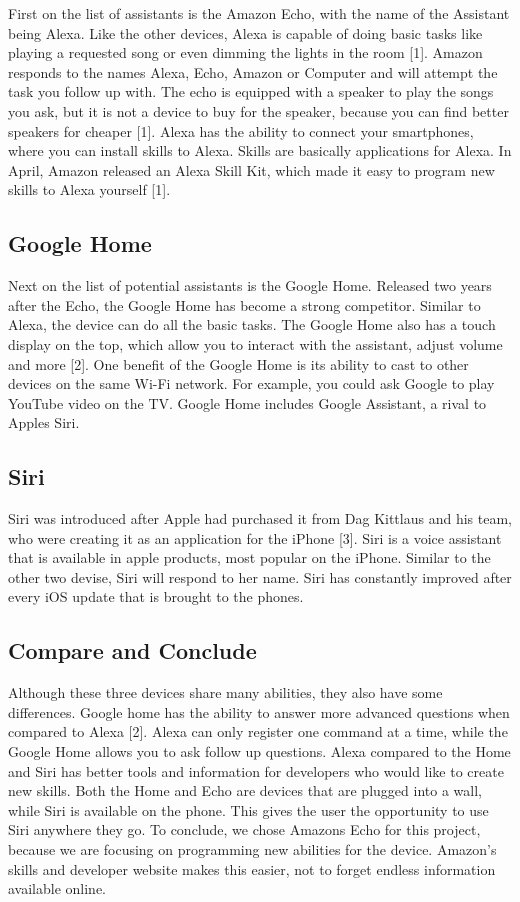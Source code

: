\documentclass[onecolumn, draftclsnofoot,10pt, compsoc]{IEEEtran}
\begin{document}
		First on the list of assistants is the Amazon Echo, with the name of the Assistant being Alexa. Like the other devices, Alexa is capable of doing basic tasks like playing a requested song or even dimming 
		the lights in the room [1]. Amazon responds to the names Alexa, Echo, Amazon or Computer and will attempt the task you follow up with. The echo is equipped with a speaker to play the songs you ask, but it is
		not a device to buy for the speaker, because you can find better speakers for cheaper [1]. Alexa has the ability to connect your smartphones, where you can install skills to Alexa. Skills are basically applications
		for Alexa. In April, Amazon released an Alexa Skill Kit, which made it easy to program new skills to Alexa yourself [1]. 
		
	\subsection{Google Home}	
	
		Next on the list of potential assistants is the Google Home. Released two years after the Echo, the Google Home has become a strong competitor. Similar to Alexa, the device can do all the basic tasks. The Google Home 
		also has a touch display on the top, which allow you to interact with the assistant, adjust volume and more [2]. One benefit of the Google Home is its ability to cast to other devices on the same Wi-Fi network. For example, 
		you could ask Google to play YouTube video on the TV. Google Home includes Google Assistant, a rival to Apples Siri.
		
	\subsection{Siri}
	
		Siri was introduced after Apple had purchased it from Dag Kittlaus and his team, who were creating it as an application for the iPhone [3]. Siri is a voice assistant that is available in apple products, most popular on the iPhone.
		Similar to the other two devise, Siri will respond to her name. Siri has constantly improved after every iOS update that is brought to the phones.
		
	\subsection{Compare and Conclude}
	
		Although these three devices share many abilities, they also have some differences. Google home has the ability to answer more advanced questions when compared to Alexa [2]. Alexa can only register one command at a time, while the Google 
		Home allows you to ask follow up questions. Alexa compared to the Home and Siri has better tools and information for developers who would like to create new skills. Both the Home and Echo are devices that are plugged into a wall, while Siri
		is available on the phone. This gives the user the opportunity to use Siri anywhere they go. To conclude, we chose Amazons Echo for this project, because we are focusing on programming new abilities for the device. Amazon’s skills and developer 
		website makes this easier, not to forget endless information available online.
		
\end{document}
